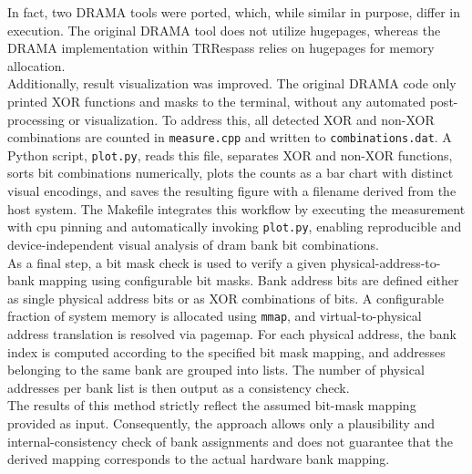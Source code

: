         In fact, two DRAMA tools were ported, which, while similar in purpose, 
        differ in execution. The original DRAMA tool does not utilize 
        hugepages, whereas the DRAMA implementation within TRRespass relies on hugepages for memory allocation.
        \\
        Additionally, result visualization was improved. The original DRAMA code only printed XOR functions 
        and masks to the terminal, without any automated post-processing or visualization. To address this, 
        all detected XOR and non-XOR combinations are counted in \texttt{measure.cpp} and written to \texttt{combinations.dat}. 
        A Python script, \texttt{plot.py}, reads this file, separates XOR and non-XOR functions, sorts bit combinations 
        numerically, plots the counts as a bar chart with distinct visual encodings, and saves the resulting 
        figure with a filename derived from the host system. The Makefile integrates this workflow by executing 
        the measurement with \gls{cpu} pinning and automatically invoking \texttt{plot.py}, enabling reproducible and 
        device-independent visual analysis of \gls{dram} bank bit combinations.
        \\
        As a final step, a bit mask check is used to verify a given physical-address-to-bank mapping using 
        configurable bit masks. Bank address bits are defined either as single physical address bits or as 
        XOR combinations of bits. A configurable fraction of system memory is allocated using \texttt{mmap}, and 
        virtual-to-physical address translation is resolved via pagemap. For each physical address, the 
        bank index is computed according to the specified bit mask mapping, and addresses belonging to 
        the same bank are grouped into lists. The number of physical addresses per bank list is then 
        output as a consistency check.
        \\
        The results of this method strictly reflect the assumed bit-mask mapping provided as input. 
        Consequently, the approach allows only a plausibility and internal-consistency check of bank 
        assignments and does not guarantee that the derived mapping corresponds to the actual hardware 
        bank mapping.
